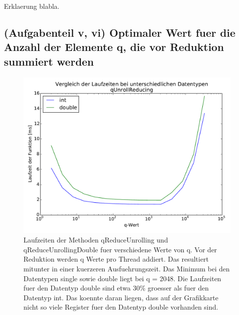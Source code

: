 \documentclass[10pt,a4paper]{article}
\begin{document}
Erklaerung blabla.


\subsection{(Aufgabenteil v, vi) \newline Optimaler Wert fuer die Anzahl der Elemente q, die vor Reduktion
  summiert werden}

\begin{figure}[H]
  \centering
  \includegraphics[width=\textwidth]{../figures/laufzeiten_qunroll_int_double.pdf}
  \caption{Laufzeiten der Methoden qReduceUnrolling und qReduceUnrollingDouble
    fuer verschiedene Werte von q. Vor der Reduktion werden q Werte pro Thread
    addiert. Das resultiert mitunter in einer kuerzeren Ausfuehrungszeit. Das
    Minimum bei den Datentypen single sowie double liegt bei q = 2048. Die
    Laufzeiten fuer den Datentyp double sind etwa 30\% groesser als fuer den
    Datentyp int. Das koennte daran liegen, dass auf der Grafikkarte nicht so
    viele Register fuer den Datentyp double vorhanden sind.}
  \label{fig:optimaler_q}
\end{figure}
\end{document}
